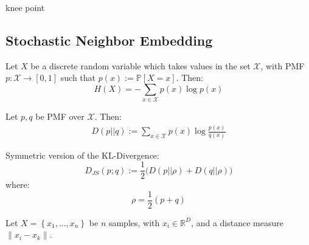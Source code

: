 \documentclass{article}
\begin{document}
\begin{remark} knee point 
\end{remark}

\subsection{Stochastic Neighbor Embedding}
\begin{definition}  Let $X$ be a discrete random variable which takes values in the set $\mathcal{X}$, with PMF $p: \mathcal{X} \to [0,1]$ such that $p(x) := \mathbb{P}[X = x]$. Then:
  \[
    H(X) = - \sum_{x \in \mathcal{X}} p(x) \log p(x)
  \]
  
\end{definition}

\begin{definition}[KL Divergence] Let $p,q$ be PMF over $\mathcal{X}$. Then:
\begin{align*}
  D(p||q) := \sum_{x \in \mathcal{X} } p(x) \log \frac{p(x)}{q(x)}
\end{align*}
\end{definition}

\begin{definition} Symmetric version of the KL-Divergence:
\[
  D_{JS}(p ; q) := \frac{1}{2} \big( D(p || \rho) + D(q ||  \rho)  \big)
\]
where:
\[
  \rho = \frac{1}{2} (p+q)
\]
\end{definition}

Let $X = \left\{  x_1, \ldots, x_n \right\}$ be $n$ samples, with $x_i \in \mathbb{R}^{D}$, 
and a distance measure $\lVert x_i - x_k \rVert$. 
\end{document}
